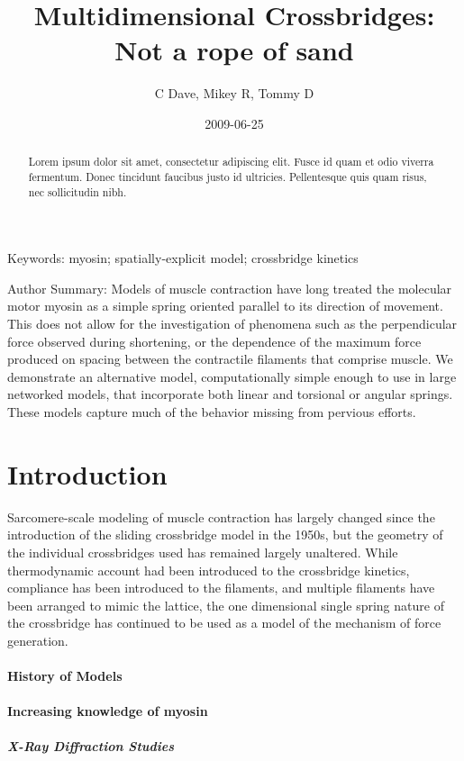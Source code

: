 \documentclass[]{article}
\title{Multidimensional Crossbridges: Not a rope of sand}
\author{C Dave, Mikey R, Tommy D}
\date{2009-06-25}
\begin{document}
\maketitle

 
\begin{abstract}
	Lorem ipsum dolor sit amet, consectetur adipiscing elit. Fusce id quam et odio viverra fermentum. Donec tincidunt faucibus justo id ultricies. Pellentesque quis quam risus, nec sollicitudin nibh. 
\end{abstract}

Keywords: myosin; spatially-explicit model; crossbridge kinetics

Author Summary: 
Models of muscle contraction have long treated the molecular motor myosin as a simple spring oriented parallel to its direction of movement. 
This does not allow for the investigation of phenomena such as the perpendicular force observed during shortening, or the dependence of the maximum force produced on spacing between the contractile filaments that comprise muscle.
We demonstrate an alternative model, computationally simple enough to use in large networked models, that incorporate both linear and torsional or angular springs. These models capture much of the behavior missing from pervious efforts.

\section{Introduction}
Sarcomere-scale modeling of muscle contraction has largely changed since the introduction of the sliding crossbridge model in the 1950s, but the geometry of the individual crossbridges used has remained largely unaltered. 
While thermodynamic account had been introduced to the crossbridge kinetics, compliance has been introduced to the filaments, and multiple filaments have been arranged to mimic the lattice, the one dimensional single spring nature of the crossbridge has continued to be used as a model of the mechanism of force generation.

\paragraph*{History of Models}

\paragraph*{Increasing knowledge of myosin}

\subparagraph*{X-Ray Diffraction Studies}
\end{document}
